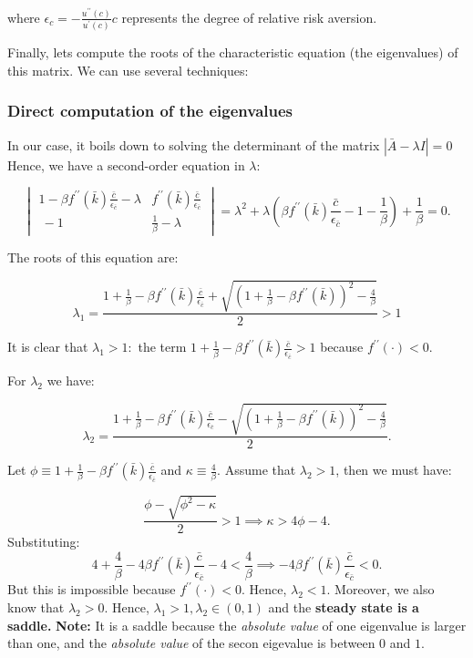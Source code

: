 \documentclass[11pt,a4paper,english]{article}
\begin{document}
where
\(\epsilon_{c} = - \frac{u^{\prime \prime}( c )}{u^{\prime}( c )} c\)
represents the degree of relative risk aversion.

Finally, lets compute the roots of the characteristic equation (the
eigenvalues) of this matrix. We can use several techniques:

\hypertarget{direct-computation-of-the-eigenvalues}{%
\subsubsection{Direct computation of the
eigenvalues}\label{direct-computation-of-the-eigenvalues}}

In our case, it boils down to solving the determinant of the matrix
\(|\bar{A} - \lambda I|=0\) Hence, we have a second-order equation in
\(\lambda\):

\[\begin{vmatrix}
    1-\beta f^{\prime \prime}(\bar{k})\frac{\bar{c}}{\epsilon_{\bar{c}}} - \lambda & f^{\prime \prime}(\bar{k}) \frac{\bar{c}}{\epsilon_{\bar{c}}} \\\
    -1 & \frac{1}{\beta} - \lambda
\end{vmatrix} = 
\lambda^{2} + \lambda \left( \beta f^{\prime \prime} (\bar{k}) \frac{\bar{c}}{\epsilon_{\bar{c}}} - 1 - \frac{1}{\beta} \right) + \frac{1}{\beta} = 0.\]

The roots of this equation are:

\[\lambda_{1} = \frac{1+\frac{1}{\beta} - \beta f^{\prime \prime}(\bar{k}) \frac{\bar{c}}{\epsilon_{\bar{c}}} + \sqrt{\left( 1+\frac{1}{\beta} - \beta f^{\prime \prime}(\bar{k}) \right)^2 - \frac{4}{\beta}}}{2} > 1\]

It is clear that \(\lambda_{1} > 1:\) the term
\(1+\frac{1}{\beta} - \beta f^{\prime \prime}(\bar{k}) \frac{\bar{c}}{\epsilon_{\bar{c}}} > 1\)
because \(f^{\prime \prime}(\cdot) < 0.\)

For \(\lambda_{2}\) we have:

\[\lambda_{2} = \frac{1+\frac{1}{\beta} - \beta f^{\prime \prime}(\bar{k}) \frac{\bar{c}}{\epsilon_{\bar{c}}} - \sqrt{\left( 1+\frac{1}{\beta} - \beta f^{\prime \prime}(\bar{k}) \right)^2 - \frac{4}{\beta}}}{2}.\]

Let
\(\phi \equiv 1+\frac{1}{\beta} - \beta f^{\prime \prime}(\bar{k}) \frac{\bar{c}}{\epsilon_{\bar{c}}}\)
and \(\kappa \equiv \frac{4}{\beta}\). Assume that \(\lambda_{2} > 1\),
then we must have:

\[\frac{\phi - \sqrt{\phi^{2} - \kappa}}{2} > 1 \implies \kappa > 4\phi - 4.\]
Substituting:
\[4 + \frac{4}{\beta} - 4 \beta f^{\prime \prime}(\bar{k})\frac{\bar{c}}{\epsilon_{\bar{c}}} - 4 < \frac{4}{\beta} \implies -4\beta f^{\prime \prime}(\bar{k})\frac{\bar{c}}{\epsilon_{\bar{c}}} < 0.\]
But this is impossible because \(f^{\prime \prime}(\cdot) < 0.\) Hence,
\(\lambda_{2} < 1\). Moreover, we also know that \(\lambda_{2} > 0\).
Hence, \(\lambda_{1} > 1, \lambda_{2}\in(0,1)\) and the \textbf{steady
state is a saddle.} \textbf{Note:} It is a saddle because the
\emph{absolute value} of one eigenvalue is larger than one, and the
\emph{absolute value} of the secon eigevalue is between \(0\) and \(1.\)
\end{document}
